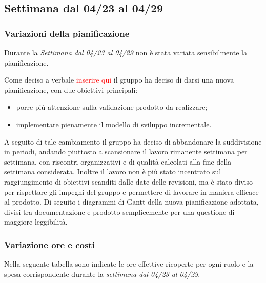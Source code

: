 


\subsection{Settimana dal 04/23 al 04/29 }
\label{sec:Consuntivo1Sett}
\subsubsection{Variazioni della pianificazione}
Durante la \textit{Settimana dal 04/23 al 04/29} non è stata variata sensibilmente la pianificazione.

Come deciso a verbale \textcolor{red}{inserire qui} il gruppo ha deciso di darsi una nuova pianificazione, con due obiettivi principali:
\begin{itemize}
	\item porre più attenzione sulla validazione prodotto da realizzare;
	\item implementare pienamente il modello di sviluppo incrementale.
\end{itemize}

A seguito di tale cambiamento il gruppo ha deciso di abbandonare la suddivisione in periodi, andando piuttosto a scansionare il lavoro rimanente settimana per settimana, con riscontri organizzativi e di qualità calcolati alla fine della settimana considerata. Inoltre il lavoro non è più stato  incentrato sul raggiungimento di obiettivi scanditi dalle date delle revisioni, ma è stato diviso per rispettare gli impegni del gruppo e permettere di lavorare in maniera efficace al prodotto. Di seguito i diagrammi di Gantt della nuova pianificazione adottata, divisi
tra documentazione e prodotto semplicemente per una questione di maggiore leggibilità.


\subsubsection{Variazione ore e costi}
Nella seguente tabella sono indicate le ore effettive ricoperte per ogni ruolo e la spesa corrispondente durante la \textit{settimana dal 04/23 al 04/29}.

